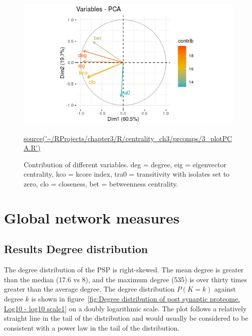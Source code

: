 \begin{figure}
    \centering
    \includegraphics[width=\textwidth]{images/chapter3/centrality_pca_factoextra/Rplot_smaller_pca.png}
    \caption{Contribution of different variables. deg = degree, eig = eigenvector centrality, kco = kcore index, tra0 = transitivity with isolates set to zero, clo = closeness, bet = betweenness centrality.} 
    \tiny\url{source('~/RProjects/chapter3/R/centrality_ch3/prcomps/3_plotPCA.R')}
    \label{fig:PCA_contributions}
\end{figure}



\clearpage
\section{Global network measures}




\subsection{Results Degree distribution}
\label{sec:results degree distribution}
The degree distribution of the PSP is right-skewed. The mean degree is greater than the median (17.6 vs 8), and the maximum degree (535) is over thirty times greater than the average degree. 
 The degree distribution $P(K=k)$ against degree $k$ is shown in figure~\ref{fig:Degree distribution of post synaptic proteome. Log10 - log10 scale1} on a doubly logarithmic scale. The plot follows a relatively straight line in the tail of the distribution and would usually be considered to be consistent with a power law in the tail of the distribution.

